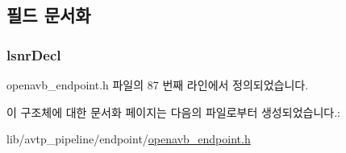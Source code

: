 \subsection{필드 문서화}
\subsubsection[{\texorpdfstring{lsnr\+Decl}{lsnrDecl}}]{ lsnr\+Decl}\hypertarget{structopenavb_endpoint_params___listener_attach__t_a48a44c7abb58139ee25badb861e01a38}{}\label{structopenavb_endpoint_params___listener_attach__t_a48a44c7abb58139ee25badb861e01a38}


openavb\+\_\+endpoint.\+h 파일의 87 번째 라인에서 정의되었습니다.



이 구조체에 대한 문서화 페이지는 다음의 파일로부터 생성되었습니다.\+:\begin{DoxyCompactItemize}
\item 
lib/avtp\+\_\+pipeline/endpoint/\hyperlink{openavb__endpoint_8h}{openavb\+\_\+endpoint.\+h}\end{DoxyCompactItemize}
